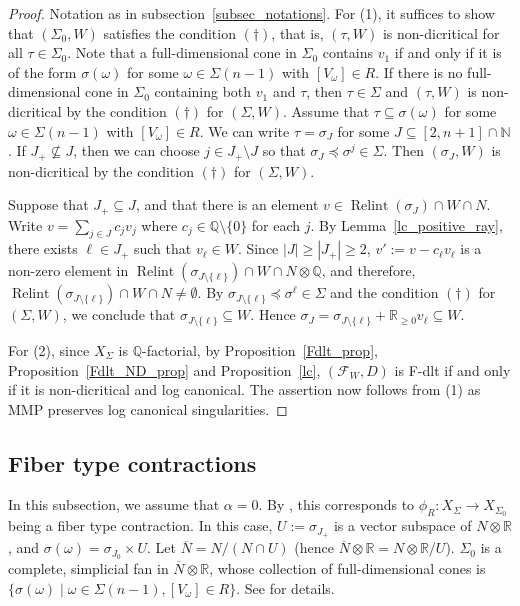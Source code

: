 \documentclass[12pt,reqno]{amsart}
\theoremstyle{definition}
\newcommand{\mc}{\mathcal}
\newcommand{\mb}{\mathbb}
\newcommand{\on}{\operatorname}
\newcommand\bN{{\mathbb N}}
\newcommand\bQ{{\mathbb Q}}
\newcommand\bR{{\mathbb R}}
\begin{document}
\begin{proof}
Notation as in subsection~\ref{subsec_notations}. 
    For (1), it suffices to show that $(\Sigma_0,W)$ satisfies the condition $(\dagger)$, that is, $(\tau,W)$ is non-dicritical for all $\tau\in\Sigma_0$. Note that a full-dimensional cone in $\Sigma_0$ contains $v_1$ if and only if it is of the form $\sigma(\omega)$ for some $\omega\in\Sigma(n-1)$ with $[V_\omega]\in R$. If there is no full-dimensional cone in $\Sigma_0$ containing both $v_1$ and $\tau$, then $\tau\in\Sigma$ and $(\tau,W)$ is non-dicritical by the condition $(\dagger)$ for $(\Sigma,W)$.
    Assume that $\tau\subseteq\sigma(\omega)$ for some $\omega\in\Sigma(n-1)$ with $[V_\omega]\in R$. We can write $\tau=\sigma_J$ for some $J\subseteq [2,n+1]\cap\bN$. 
    If $J_+\nsubseteq J$, then we can choose $j\in J_+\setminus J$ so that $\sigma_J\preceq\sigma^j\in \Sigma$.
    Then $(\sigma_J,W)$ is non-dicritical by the condition $(\dagger)$ for $(\Sigma,W)$. 
        
    Suppose that $J_+\subseteq J$, and that there is an element $v\in\on{Relint}(\sigma_J)\cap W\cap N$.  Write $v=\sum_{j\in J}c_jv_j$ where $c_j\in\bQ\setminus\{0\}$ for each $j$. 
    By Lemma~\ref{lc_positive_ray}, there exists $\ell\in J_+$ such that $v_\ell\in W$.
     Since $|J|\geq|J_+|\geq 2$, $v':=v-c_\ell v_\ell$ is a non-zero element in $\on{Relint}(\sigma_{J\setminus\{\ell\}})\cap W\cap N\otimes\bQ$, and  
    therefore, $\on{Relint}(\sigma_{J\setminus\{\ell\}})\cap W\cap N\neq\emptyset$. 
    By $\sigma_{J\setminus\{\ell\}}\preceq \sigma^\ell\in\Sigma$ and the
    condition $(\dagger)$ for $(\Sigma,W)$, we conclude that $\sigma_{J\setminus\{\ell\}}\subseteq W$.
    Hence $\sigma_J=\sigma_{J\setminus\{\ell\}}+\mb R_{\geq 0}v_\ell\subseteq W$.
       
    For (2), since $X_\Sigma$ is $\mb Q$-factorial, by Proposition~\ref{Fdlt_prop}, Proposition~\ref{Fdlt_ND_prop} and Proposition~\ref{lc}, $(\mc F_W,D)$ is F-dlt if and only if it is non-dicritical and log canonical. The assertion now follows from (1) as MMP preserves log canonical singularities.
\end{proof}

\subsection{Fiber type contractions}

In this subsection, we assume that $\alpha=0$. By \cite[Corollary 14-2-2]{matsuki2002mmp}, this corresponds to $\phi_R\colon X_\Sigma\to X_{\Sigma_0}$ being a fiber type contraction. In this case, $U:=\sigma_{J_+}$ is a vector subspace of $N\otimes\bR$, and $\sigma(\omega)=\sigma_{J_0}\times U$. 
Let $\overline{N}=N/(N\cap U)$ (hence $\overline{N}\otimes\bR=N\otimes\bR/U$).
$\Sigma_0$ is a complete, simplicial fan in $\overline{N}\otimes\bR$, whose collection of full-dimensional cones is $\{\sigma(\omega)\mid \omega\in\Sigma(n-1), [V_\omega]\in R\}$. 
See \cite[Theorem 14-1-9 and its proof, Proposition 14-2-1]{matsuki2002mmp} for details.  
\end{document}
